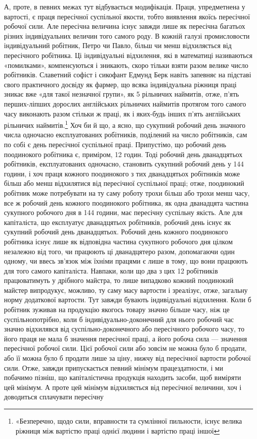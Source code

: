 А, проте, в певних межах тут відбувається модифікація. Праця,
упредметнена у вартості, є праця пересічної суспільної якости,
тобто виявлення якоїсь пересічної робочої сили. Але пересічна
величина існує завжди лише як пересічна багатьох різних індивідуальних величин того самого роду. В
кожній галузі промисловости індивідуальний робітник, Петро чи Павло, більш чи менш
відхиляється від пересічного робітника. Ці індивідуальні відхилення, які в математиці називаються
«помилками», компенсуються і зникають, скоро тільки взяти разом велике число робітників. Славетний
софіст і сикофант Едмунд Берк навіть запевняє
на підставі свого практичного досвіду як фармер, що всяка індивідуальна ріжниця праці зникає вже
«для такої незначної групи»,
як 5 рільничих наймитів, отже, п’ять перших-ліпших дорослих
англійських рільничих наймитів протягом того самого часу виконають разом стільки ж праці, як і
яких-будь інших п’ять англійських рільничих наймитів.\footnote{
«Безперечно, щодо сили, вправности та сумлінної пильности, існує
велика ріжниця між вартістю праці однієї людини і вартістю праці іншої
} Хоч би й що, а ясно, що сукупний
робочий день значного числа одночасно експлуатованих робітників, поділений на число робітників, сам
по собі є день пересічної суспільної праці. Припустімо, що робочий день поодинокого робітника є,
приміром, 12 годин. Тоді робочий день дванадцятьох робітників, експлуатованих одночасно, становить
сукупний робочий день у 144 години, і хоч праця кожного поодинокого
з тих дванадцятьох робітників може більш або менш відхилятися від пересічної суспільної праці; отже,
поодинокий робітник
може потребувати на ту саму роботу трохи більш або трохи менш
часу, все ж робочий день кожного поодинокого робітника, як
одна дванадцята частина сукупного робочого дня в 144 години,
має пересічну суспільну якість. Але для капіталіста, що експлуатує дванадцятьох робітників, робочий
день існує як сукупний
робочий день дванадцятьох. Робочий день кожного поодинокого
робітника існує лише як відповідна частина сукупного робочого
дня цілком незалежно від того, чи працюють ці дванадцятеро
разом, допомагаючи один одному, чи ввесь зв’язок між їхніми
працями є лише в тому, що вони працюють для того самого капіталіста. Навпаки, коли що два з цих 12
робітників працюватимуть
у дрібного майстра, то лише випадково кожний поодинокий майстер випродукує, можливо, ту саму масу
вартости і зреалізує,
отже, загальну норму додаткової вартости. Тут завжди бувають
індивідуальні відхилення. Коли б робітник зуживав на продукцію якогось товару значно більше часу,
ніж це суспільнопотрібно, коли б індивідуально-доконечний для нього робочий
час значно відхилявся від суспільно-доконечного або пересічного
робочого часу, то його праця не мала б значення пересічної праці,
а його робоча сила — значення пересічної робочої сили. Цієї робочої сили або зовсім не можна було б
продати, або її можна було б
продати лише за ціну, нижчу від пересічної вартости робочої сили.
Отже, завжди припускається певний мінімум працездатности, і ми
побачимо пізніш, що капіталістична продукція находить засоби,
щоб виміряти цей мінімум. А проте цей мінімум відхиляється
від пересічної величини, хоч і доводиться сплачувати пересічну

